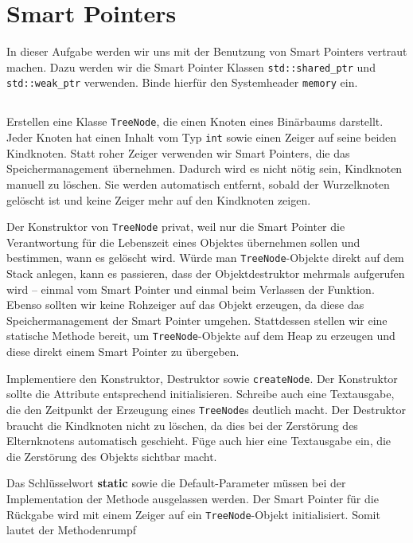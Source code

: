 \section{Smart Pointers}
In dieser Aufgabe werden wir uns mit der Benutzung von Smart Pointers vertraut machen. Dazu werden wir die Smart Pointer Klassen \lstinline{std::shared_ptr} und \lstinline{std::weak_ptr} verwenden. Binde hierfür den Systemheader \lstinline{memory} ein.


\subsection{}
Erstellen eine Klasse \lstinline{TreeNode}, die einen Knoten eines Binärbaums darstellt.
Jeder Knoten hat einen Inhalt vom Typ \lstinline{int} sowie einen Zeiger auf seine beiden Kindknoten.
Statt \glqq roher\grqq{} Zeiger verwenden wir Smart Pointers, die das Speichermanagement übernehmen.
Dadurch wird es nicht nötig sein, Kindknoten manuell zu löschen.
Sie werden automatisch entfernt, sobald der Wurzelknoten gelöscht ist und keine Zeiger mehr auf den Kindknoten zeigen.



Der Konstruktor von \lstinline{TreeNode} privat, weil nur die Smart Pointer die Verantwortung für die Lebenszeit eines Objektes übernehmen sollen und bestimmen, wann es gelöscht wird.
Würde man \lstinline{TreeNode}-Objekte direkt auf dem Stack anlegen, kann es passieren, dass der Objektdestruktor mehrmals aufgerufen wird -- einmal vom Smart Pointer und einmal beim Verlassen der Funktion.
Ebenso sollten wir keine Rohzeiger auf das Objekt erzeugen, da diese das Speichermanagement der Smart Pointer umgehen.
Stattdessen stellen wir eine statische Methode bereit, um \lstinline{TreeNode}-Objekte auf dem Heap zu erzeugen und diese direkt einem Smart Pointer zu übergeben.

Implementiere den Konstruktor, Destruktor sowie \lstinline{createNode}.
Der Konstruktor sollte die Attribute entsprechend initialisieren.
Schreibe auch eine Textausgabe, die den Zeitpunkt der Erzeugung eines \lstinline{TreeNode}s deutlich macht.
Der Destruktor braucht die Kindknoten nicht zu löschen, da dies bei der Zerstörung des Elternknotens automatisch geschieht.
Füge auch hier eine Textausgabe ein, die die Zerstörung des Objekts sichtbar macht.

Das Schlüsselwort \textbf{static} sowie die Default-Parameter müssen bei der Implementation der Methode ausgelassen werden.
Der Smart Pointer für die Rückgabe wird mit einem Zeiger auf ein \lstinline{TreeNode}-Objekt initialisiert. Somit lautet der Methodenrumpf


